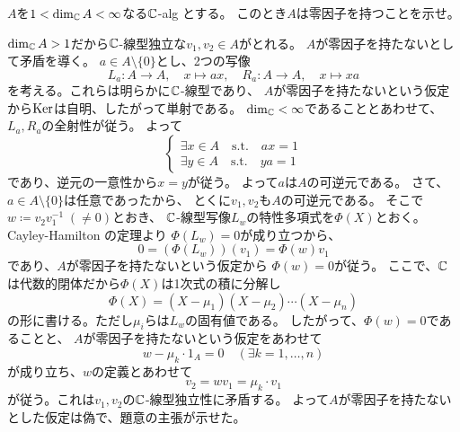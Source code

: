\documentclass[report]{jlreq}
\begin{document}
\begin{problem}[代数学II 1.10]
    $A$を$1 < \dim_{\mathbb{C}} A < \infty$なる$\mathbb{C}$-alg とする。
    このとき$A$は零因子を持つことを示せ。
\end{problem}

\begin{answer}
    $\dim_{\mathbb{C}} A > 1$だから$\mathbb{C}$-線型独立な$v_1, v_2 \in A$がとれる。
    $A$が零因子を持たないとして矛盾を導く。
    $a \in A \setminus \{0\}$とし、2つの写像
    \begin{equation}
        L_a \colon A \to A, \quad x \mapsto ax, \quad
        R_a \colon A \to A, \quad x \mapsto xa
    \end{equation}
    を考える。これらは明らかに$\mathbb{C}$-線型であり、
    $A$が零因子を持たないという仮定から$\operatorname{\mathrm{Ker}}$は自明、したがって単射である。
    $\dim_{\mathbb{C}} < \infty$であることとあわせて、
    $L_a, R_a$の全射性が従う。
    よって
    \begin{equation}
        \begin{cases}
            \exists x \in A \quad \text{s.t.} \quad ax = 1 \\
            \exists y \in A \quad \text{s.t.} \quad ya = 1
        \end{cases}
    \end{equation}
    であり、逆元の一意性から$x = y$が従う。
    よって$a$は$A$の可逆元である。
    さて、$a \in A \setminus \{0\}$は任意であったから、
    とくに$v_1, v_2$も$A$の可逆元である。
    そこで$w \coloneqq v_2 v_1^{-1}\; (\neq 0)$とおき、
    $\mathbb{C}$-線型写像$L_w$の特性多項式\footnotemark を$\Phi(X)$とおく。
    Cayley-Hamilton の定理より
    $\Phi(L_w) = 0$が成り立つから、
    \begin{equation}
        0 = (\Phi(L_w))(v_1)
            = \Phi(w) v_1
    \end{equation}
    であり、$A$が零因子を持たないという仮定から
    $\Phi(w) = 0$が従う。
    ここで、$\mathbb{C}$は代数的閉体だから$\Phi(X)$は1次式の積に分解し
    \begin{equation}
        \Phi(X) = (X - \mu_1) (X - \mu_2) \cdots (X - \mu_n)
    \end{equation}
    の形に書ける。ただし$\mu_i$らは$L_w$の固有値である。
    したがって、$\Phi(w) = 0$であることと、
    $A$が零因子を持たないという仮定をあわせて
    \begin{equation}
        w - \mu_k \cdot 1_A = 0 \quad (\exists k = 1, \dots, n)
    \end{equation}
    が成り立ち、$w$の定義とあわせて
    \begin{equation}
        v_2 = w v_1 = \mu_k \cdot v_1
    \end{equation}
    が従う。これは$v_1, v_2$の$\mathbb{C}$-線型独立性に矛盾する。
    よって$A$が零因子を持たないとした仮定は偽で、題意の主張が示せた。
\end{answer}
\end{document}

